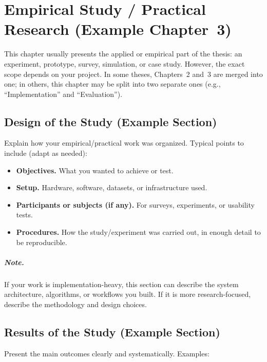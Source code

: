 \chapter{Empirical Study / Practical Research (Example Chapter~3)}
\label{chap:empirical}


This chapter usually presents the applied or empirical part of the thesis: an experiment, prototype, survey, simulation, or case study.  
However, the exact scope depends on your project. In some theses, Chapters~2 and~3 are merged into one; in others, this chapter may be split into two separate ones (e.g., “Implementation” and “Evaluation”).

\section{Design of the Study (Example Section)}
\label{sec:design}
Explain how your empirical/practical work was organized.  
Typical points to include (adapt as needed):

\begin{itemize}[leftmargin=1.2cm]
  \item \textbf{Objectives.} What you wanted to achieve or test.  
  \item \textbf{Setup.} Hardware, software, datasets, or infrastructure used.  
  \item \textbf{Participants or subjects (if any).} For surveys, experiments, or usability tests.  
  \item \textbf{Procedures.} How the study/experiment was carried out, in enough detail to be reproducible.  
\end{itemize}

\paragraph{Note.} If your work is implementation-heavy, this section can describe the system architecture, algorithms, or workflows you built. If it is more research-focused, describe the methodology and design choices.

\section{Results of the Study (Example Section)}
\label{sec:results}
Present the main outcomes clearly and systematically.  
Examples:

